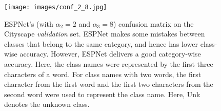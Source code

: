 \documentclass[runningheads]{llncs}
\begin{document}
\clearpage

\begin{figure}[t!]
\centering
\texttt{[image: images/conf\_2\_8.jpg]}
\caption{ESPNet's (with $\alpha_2 = 2$ and $\alpha_3 = 8$) confusion matrix on the Cityscape \textit{validation} set. ESPNet makes some mistakes between classes that belong to the same category, and hence has lower class-wise accuracy. However, ESPNet delivers a good category-wise accuracy. Here, the class names were represented by the first three characters of a word. For class names with two words, the first character from the first word and the first two characters from the second word were used to represent the class name. Here, Unk denotes the unknown class.}
\label{fig:confMatESPNet}
\end{figure}
\end{document}
